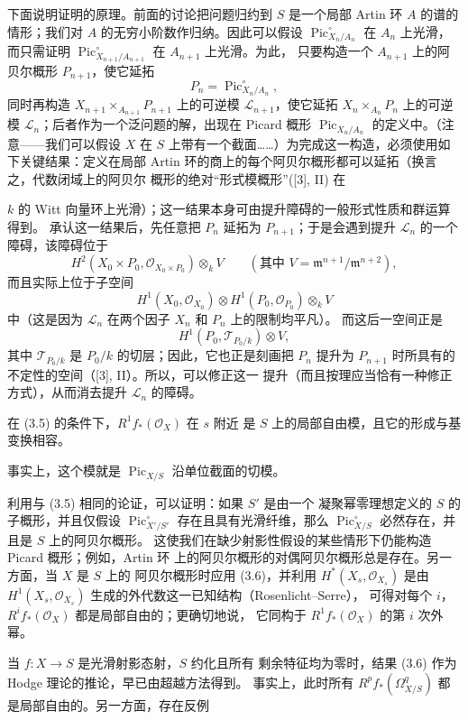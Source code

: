 下面说明证明的原理。前面的讨论把问题归约到 $S$ 是一个局部 Artin 环 $A$
的谱的情形；我们对 $A$ 的无穷小阶数作归纳。因此可以假设
$\operatorname{Pic}_{X_n/A_n}^\circ$ 在 $A_n$ 上光滑，而只需证明
$\operatorname{Pic}_{X_{n+1}/A_{n+1}}^\circ$ 在 $A_{n+1}$ 上光滑。为此，
只要构造一个 $A_{n+1}$ 上的阿贝尔概形 $P_{n+1}$，使它延拓
\[
P_n=\operatorname{Pic}_{X_n/A_n}^\circ,
\]
同时再构造 $X_{n+1}\times_{A_{n+1}}P_{n+1}$ 上的可逆模
$\mathcal L_{n+1}$，使它延拓 $X_n\times_{A_n}P_n$ 上的可逆模
$\mathcal L_n$；后者作为一个泛问题的解，出现在 Picard 概形
$\operatorname{Pic}_{X_n/A_n}$ 的定义中。（注意——我们可以假设 $X$ 在
$S$ 上带有一个截面……）为完成这一构造，必须使用如下关键结果：定义在局部
Artin 环的商上的每个阿贝尔概形都可以延拓（换言之，代数闭域上的阿贝尔
概形的绝对“形式模概形”([3], II) 在

$k$ 的 Witt 向量环上光滑）；这一结果本身可由提升障碍的一般形式性质和群运算
得到。
承认这一结果后，先任意把 $P_n$ 延拓为 $P_{n+1}$；于是会遇到提升
$\mathcal L_n$ 的一个障碍，该障碍位于
\[
H^2(X_0\times P_0,\mathcal O_{X_0\times P_0})\otimes_k V
\qquad(\text{其中 }V=\mathfrak m^{n+1}/\mathfrak m^{n+2}),
\]
而且实际上位于子空间
\[
H^1(X_0,\mathcal O_{X_0})\otimes
H^1(P_0,\mathcal O_{P_0})\otimes_k V
\]
中（这是因为 $\mathcal L_n$ 在两个因子 $X_n$ 和 $P_n$ 上的限制均平凡）。
而这后一空间正是
\[
H^1(P_0,\mathcal T_{P_0/k})\otimes V,
\]
其中 $\mathcal T_{P_0/k}$ 是 $P_0/k$ 的切层；因此，它也正是刻画把 $P_n$
提升为 $P_{n+1}$ 时所具有的不定性的空间（[3], II）。所以，可以修正这一
提升（而且按理应当恰有一种修正方式），从而消去提升 $\mathcal L_n$ 的障碍。

 在 (3.5) 的条件下，$R^1f_*(\mathcal O_X)$ 在 $s$ 附近
是 $S$ 上的局部自由模，且它的形成与基变换相容。

事实上，这个模就是 $\operatorname{Pic}_{X/S}$ 沿单位截面的切模。

 利用与 (3.5) 相同的论证，可以证明：如果 $S'$ 是由一个
凝聚幂零理想定义的 $S$ 的子概形，并且仅假设
$\operatorname{Pic}_{X'/S'}^\circ$ 存在且具有光滑纤维，那么
$\operatorname{Pic}_{X/S}^\circ$ 必然存在，并且是 $S$ 上的阿贝尔概形。
这使我们在缺少射影性假设的某些情形下仍能构造 Picard 概形；例如，Artin 环
上的阿贝尔概形的对偶阿贝尔概形总是存在。另一方面，当 $X$ 是 $S$ 上的
阿贝尔概形时应用 (3.6)，并利用 $H^*(X_s,\mathcal O_{X_s})$ 是由
$H^1(X_s,\mathcal O_{X_s})$ 生成的外代数这一已知结构（Rosenlicht--Serre），
可得对每个 $i$，$R^if_*(\mathcal O_X)$ 都是局部自由的；更确切地说，
它同构于 $R^1f_*(\mathcal O_X)$ 的第 $i$ 次外幂。

 当 $f:X\longrightarrow S$ 是光滑射影态射，$S$ 约化且所有
剩余特征均为零时，结果 (3.6) 作为 Hodge 理论的推论，早已由超越方法得到。
事实上，此时所有 $R^pf_*(\Omega^q_{X/S})$ 都是局部自由的。另一方面，存在反例

